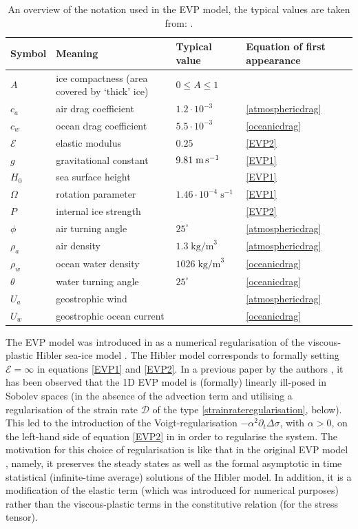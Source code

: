 \documentclass[12pt,a4paper]{article}
\theoremstyle{definition}
\theoremstyle{remark}
\numberwithin{equation}{section}
\begin{document}
\begin{table}[h]
    \centering
\begin{tabular}{ |p{2cm}||p{5cm}|p{3cm}|p{3cm}|  }
\hline
Symbol & Meaning & Typical value & Equation of first appearance\\
\hline
$A$ & ice compactness (area covered by `thick' ice) & $0 \leq A \leq 1$ & \\
$c_a$ & air drag coefficient & $1.2 \cdot 10^{-3}$ & \eqref{atmosphericdrag} \\
$c_w$ & ocean drag coefficient & $5.5 \cdot 10^{-3}$ & \eqref{oceanicdrag} \\
$\mathcal{E}$ & elastic modulus & $0.25$ & \eqref{EVP2} \\
$g$ & gravitational constant & $9.81 \; \text{m\,s}^{-1}$ & \eqref{EVP1} \\
$H_0$ & sea surface height & & \eqref{EVP1} \\
$\Omega$ &  rotation parameter & $1.46 \cdot 10^{-4} \; \text{s}^{-1}$ & \eqref{EVP1} \\
$P$ & internal ice strength & & \eqref{EVP2} \\
$\phi$ & air turning angle & $25^\circ$ & \eqref{atmosphericdrag} \\
$\rho_a$ & air density & $1.3 \; \text{kg/m}^3$ & \eqref{atmosphericdrag} \\
$\rho_w$ & ocean water density & $1026 \; \text{kg/m}^3$ & \eqref{oceanicdrag} \\
$\theta$ & water turning angle & $25^\circ$ & \eqref{oceanicdrag} \\
$U_a$ & geostrophic wind & & \eqref{atmosphericdrag} \\
$U_w$ & geostrophic ocean current & & \eqref{oceanicdrag} \\
 \hline
\end{tabular}
    \caption{An overview of the notation used in the EVP model, the typical values are taken from: \cite{hunke,hunkelinearization,mehlmann,lemieux}.}
    \label{notationtable}
\end{table}

The EVP model was introduced in \cite{hunke} as a numerical regularisation of the viscous-plastic Hibler sea-ice model \cite{hibler}. The Hibler model corresponds to formally setting $\mathcal{E} = \infty$ in equations \eqref{EVP1} and \eqref{EVP2}. In a previous paper by the authors \cite{boutros2025}, it has been observed that the 1D EVP model is (formally) linearly ill-posed in Sobolev spaces (in the absence of the advection term and utilising a regularisation of the strain rate $\mathcal{D}$ of the type \eqref{strainrateregularisation}, below). This led to the introduction of the Voigt-regularisation $-\alpha^2 \partial_t \Delta \sigma$, with $\alpha > 0$, on the left-hand side of equation \eqref{EVP2} in \cite{boutros2025} in order to regularise the system. The motivation for this choice of regularisation is like that in the original EVP model \cite{hunke}, namely, it preserves the steady states as well as the formal asymptotic in time statistical (infinite-time average) solutions of the Hibler model. In addition, it is a modification of the elastic term (which was introduced for numerical purposes) rather than the viscous-plastic terms in the constitutive relation (for the stress tensor). 
\end{document}
